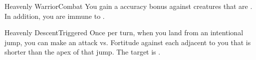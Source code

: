 \begin{feat}{Heavenly Warrior}{Combat}
     You gain a  accuracy bonus against creatures that are .
    In addition, you are immune to .

    \begin{triggeredability}{Heavenly Descent}{Triggered}
      Once per turn, when you land from an intentional jump, you can make an attack vs. Fortitude against each  adjacent to you that is shorter than the apex of that jump.
      \hit The target is \briefly \dazed.
    \end{triggeredability}
  \end{feat}






